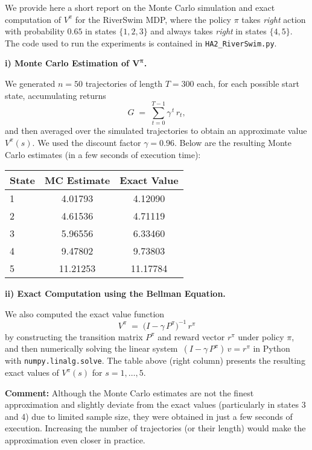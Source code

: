 We provide here a short report on the Monte Carlo simulation and exact computation of 
\(V^\pi\) for the RiverSwim MDP, where the policy \(\pi\) takes \emph{right} action 
with probability \(0.65\) in states \(\{1,2,3\}\) and always takes \emph{right} 
in states \(\{4,5\}\). 
The code used to run the experiments is contained in 
\texttt{HA2\_RiverSwim.py}.

\medskip

\noindent
\textbf{i) Monte Carlo Estimation of \(\boldsymbol{V^\pi}\).}

\noindent
We generated \(n=50\) trajectories of length \(T=300\) each, for each possible start state, 
accumulating returns
\[
  G \;=\;\sum_{t=0}^{T-1}\gamma^{\,t}\,r_t,
\]
and then averaged over the simulated trajectories to obtain 
an approximate value \(V^\pi(s)\). 
We used the discount factor \(\gamma = 0.96\). 
Below are the resulting Monte Carlo estimates (in a few seconds of execution time):

\begin{center}
\begin{tabular}{lcc}
\toprule
State & MC Estimate & Exact Value \\ 
\midrule
1 & 4.01793 & 4.12090 \\
2 & 4.61536 & 4.71119 \\
3 & 5.96556 & 6.33460 \\
4 & 9.47802 & 9.73803 \\
5 & 11.21253 & 11.17784 \\
\bottomrule
\end{tabular}
\end{center}

\noindent
\textbf{ii) Exact Computation using the Bellman Equation.}

\noindent
We also computed the exact value function 
\[
   V^\pi \;=\;\bigl(I - \gamma\,P^\pi\bigr)^{-1}\,r^\pi
\]
by constructing the transition matrix \(P^\pi\) and reward vector \(r^\pi\) under policy 
\(\pi\), and then numerically solving the linear system 
\(\,(I - \gamma\,P^\pi)\,v = r^\pi\) in Python with \texttt{numpy.linalg.solve}. 
The table above (right column) presents the resulting exact values of 
\(V^\pi(s)\) for \(s=1,\dots,5.\)

\medskip

\noindent
\textbf{Comment:} 
Although the Monte Carlo estimates are not the finest approximation and slightly deviate 
from the exact values (particularly in states 3 and 4) due to limited sample size, 
they were obtained in just a few seconds of execution. Increasing the number of trajectories 
(or their length) would make the approximation even closer in practice.